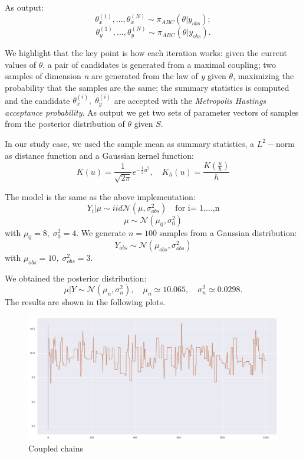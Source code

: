 \documentclass {article}
\begin{document}
As output: 
$$\theta_{x}^{(1)},...,\theta_{x}^{(N)}\sim \pi_{ABC} (\theta|y_{obs});$$
$$\theta_{y}^{(1)},...,\theta_{y}^{(N)} \sim \pi_{ABC} (\theta|y_{obs}).$$


\vspace{0.2cm}
We highlight that the key point is how each iteration works:
given the current values of $\theta$, a pair of candidates is generated from a maximal coupling; two samples of dimension \emph{n} are generated from the law of \emph{y} given $\theta$, maximizing the probability that the samples are the same;
the summary statistics is computed and the candidate $\theta_x ^{(i)}, \; \theta_y ^{(i)}$ are accepted with the \emph{Metropolis Hastings acceptance probability}. As output  we get two sets of parameter vectors of samples from the posterior distribution of $\theta$ given $S$.

In our study case, we used the sample mean as summary statistics, a $L^2-$norm as distance function and a Gaussian kernel function:
	$$
K(u) = 
\frac{1}{\sqrt{2\pi}} e^{-\frac{1}{2}u^2}, 
\quad K_h(u) 
= \frac{K(\frac u h)}{h}
$$ 

The model is the same as the above implementation: 
$$ Y_i | \mu \sim{iid} \mathcal{N}(\mu, \sigma_{obs} ^2) \quad \text{for i= 1,...,n} $$
$$ \mu  \sim \mathcal{N}(\mu_0, \sigma_0^2)$$
with $\mu_0 = 8, \; \sigma^2_0 = 4$.
We generate $n= 100$ samples from a Gaussian distribution:
$$
Y_{obs} \sim \mathcal{N}(\mu_{obs}, \sigma_{obs} ^2)
$$
with
$
\mu_{obs} = 10, \;
\sigma_{obs} ^2 = 3
$.

We obtained the posterior distribution:
$$  
\mu | Y \sim \mathcal{N}(\mu_n, \sigma^2_n), 
\quad \mu_n  \simeq 10.065,
\quad \sigma^2_n \simeq 0.0298.
$$
The results are shown in the following plots.
\begin{figure}[h!]
	\centering
	\includegraphics[width=\textwidth]{abc_coupling/2catabccoupling}	
	\caption{Coupled chains}
	\label{complete1}
	
\end{figure}
\end{document}
